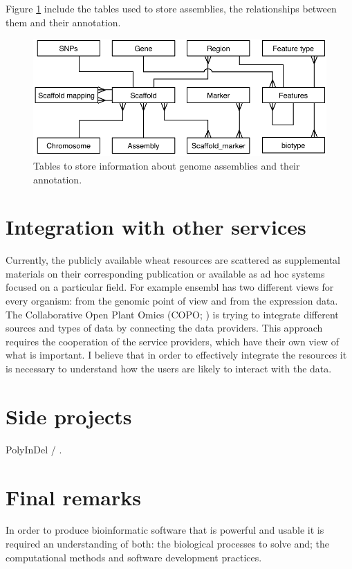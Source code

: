 Figure \ref{fig:discussion:assemblyTables} include the tables used to store assemblies, the relationships between them and their annotation. 

\begin{figure}
\includegraphics[width=1\textwidth]{Conclusions/Figures/assemblyTables.pdf}
\caption{Tables to store information about genome assemblies and their annotation.}
\label{fig:discussion:assemblyTables}
\end{figure}

\section{Integration with other services}
Currently, the publicly available wheat resources are scattered as supplemental materials on their corresponding publication or available as ad hoc systems focused on a particular field.
For example ensembl has two different views for every organism: from the genomic point of view and from the expression data. 
The Collaborative Open Plant Omics (COPO; \citealt{Davey2015}) is trying to integrate different sources and types of data by connecting the data providers. 
This approach requires the cooperation of the service providers, which have their own view of what is important. 
I believe that in order to effectively integrate the resources it is necessary to understand how the users are likely to interact with the data.


\section{Side projects}

PolyInDel / . 

\section{Final remarks}

In order to produce bioinformatic software that is powerful and usable it is required an understanding of both: the biological processes to solve and; the computational methods and software development practices.
